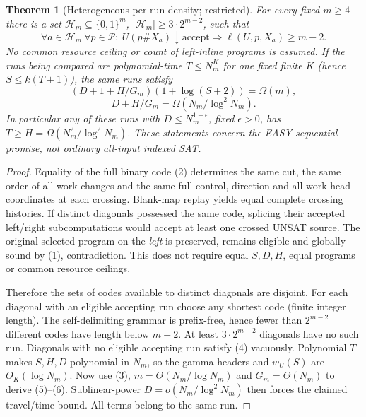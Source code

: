 \documentclass[11pt]{article}
\newtheorem{theorem}{Theorem}
\begin{document}
\begin{theorem}[Heterogeneous per-run density; restricted]
For every fixed $m\ge4$ there is a set
$\mathcal H_m\subseteq\{0,1\}^m$,
$|\mathcal H_m|\ge3\cdot2^{m-2}$, such that
\[
\forall a\in\mathcal H_m\ \forall p\in\mathcal P:
\ U(p\#X_a)\downarrow\mathrm{accept}
\Longrightarrow\ell(U,p,X_a)\ge m-2.                  \tag{4}
\]
No common resource ceiling or count of left-inline programs is
assumed. If the runs being compared are polynomial-time
$T\le N_m^K$ for one fixed finite $K$ (hence $S\le k(T+1)$),
the \emph{same runs} satisfy
\[
\boxed{(D+1+H/G_m)(1+\log(S+2))=\Omega(m),}
\tag{5}
\]
\[
\boxed{D+H/G_m=\Omega(N_m/\log^2N_m).}                 \tag{6}
\]
In particular any of these runs with
$D\le N_m^{1-\epsilon}$, fixed $\epsilon>0$, has
$T\ge H=\Omega(N_m^2/\log^2N_m)$.
These statements concern the EASY sequential promise, not
ordinary all-input indexed SAT.
\end{theorem}
\begin{proof}
Equality of the full binary code (2) determines the same cut,
the same order of all work changes and the same full control,
direction and all work-head coordinates at each crossing.
Blank-map replay yields equal complete crossing histories.
If distinct diagonals possessed the same code, splicing their
accepted left/right subcomputations would accept at least one
crossed UNSAT source. The original selected program on the
\emph{left} is preserved, remains eligible and globally sound
by (1), contradiction. This does not require equal $S,D,H$,
equal programs or common resource ceilings.

Therefore the sets of codes available to distinct diagonals
are disjoint. For each diagonal with an eligible accepting run
choose any shortest code (finite integer length). The
self-delimiting grammar is prefix-free, hence fewer than
$2^{m-2}$ different codes have length below $m-2$.
At least $3\cdot2^{m-2}$ diagonals have no such run.
Diagonals with no eligible accepting run satisfy (4) vacuously.
Polynomial $T$ makes $S,H,D$ polynomial in $N_m$, so the
gamma headers and $w_U(S)$ are $O_K(\log N_m)$.
Now use (3), $m=\Theta(N_m/\log N_m)$ and
$G_m=\Theta(N_m)$ to derive (5)--(6).
Sublinear-power $D=o(N_m/\log^2N_m)$ then forces the
claimed travel/time bound. All terms belong to the same run.
\end{proof}
\end{document}
